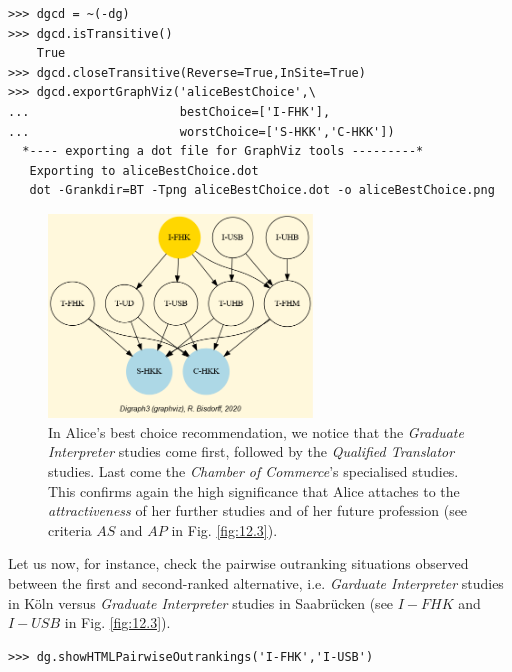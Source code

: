 \begin{lstlisting}
>>> dgcd = ~(-dg)
>>> dgcd.isTransitive()
    True
>>> dgcd.closeTransitive(Reverse=True,InSite=True)
>>> dgcd.exportGraphViz('aliceBestChoice',\
...                     bestChoice=['I-FHK'],
...                     worstChoice=['S-HKK','C-HKK'])
  *---- exporting a dot file for GraphViz tools ---------*
   Exporting to aliceBestChoice.dot
   dot -Grankdir=BT -Tpng aliceBestChoice.dot -o aliceBestChoice.png
\end{lstlisting}
\begin{figure}[h]
\sidecaption
\includegraphics[width=7cm]{Figures/aliceBestChoice.png}
\caption{In Alice's best choice recommendation, we notice that the \emph{Graduate Interpreter} studies come first, followed by the \emph{Qualified Translator} studies. Last come the \emph{Chamber of Commerce}'s specialised studies. This confirms again the high significance that Alice attaches to the \emph{attractiveness} of her further studies and of her future profession (see criteria $AS$ and $AP$ in Fig. \ref{fig:12.3}).
}
\label{fig:12.5}       %
\end{figure}

Let us now, for instance, check the pairwise outranking situations observed between the first and second-ranked alternative, i.e. \emph{Garduate Interpreter} studies in Köln versus \emph{Graduate Interpreter} studies in Saabrücken (see $I-FHK$ and $I-USB$ in Fig. \ref{fig:12.3}).

\begin{lstlisting}
>>> dg.showHTMLPairwiseOutrankings('I-FHK','I-USB')
\end{lstlisting}

